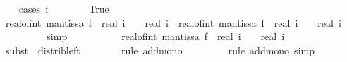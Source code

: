 \begin{isabellebody}
\ \ \isamarkupfalse%
\ {\isacharparenleft}{\kern0pt}cases\ {\isachardoublequoteopen}i\ {\isasymge}\ {}{\isachardoublequoteclose}{\isacharparenright}{\kern0pt}\isanewline
\ \ \ \ \isamarkupfalse%
\ True\isanewline
\ \ \ \ \isamarkupfalse%
\ {\isachardoublequoteopen}{\isasymbar}real{\isacharunderscore}{\kern0pt}of{\isacharunderscore}{\kern0pt}int\ {\isacharparenleft}{\kern0pt}mantissa\ f{\isacharparenright}{\kern0pt}{\isasymbar}\ {\isacharasterisk}{\kern0pt}\ {\isacharparenleft}{\kern0pt}real\ i\ {\isacharplus}{\kern0pt}\ {}{\isacharparenright}{\kern0pt}\ {\isacharplus}{\kern0pt}\ real\ i\ {\isacharequal}{\kern0pt}\ {\isasymbar}real{\isacharunderscore}{\kern0pt}of{\isacharunderscore}{\kern0pt}int\ {\isacharparenleft}{\kern0pt}mantissa\ f{\isacharparenright}{\kern0pt}{\isasymbar}\ {\isacharasterisk}{\kern0pt}\ {\isacharparenleft}{\kern0pt}real\ i\ {\isacharplus}{\kern0pt}\ {}{\isacharparenright}{\kern0pt}\ {\isacharplus}{\kern0pt}\ {\isacharparenleft}{\kern0pt}real\ i\ {\isacharminus}{\kern0pt}\ {}{\isacharparenright}{\kern0pt}\ {\isacharplus}{\kern0pt}\ {}{\isachardoublequoteclose}\isanewline
\ \ \ \ \ \ \isamarkupfalse%
\ simp\isanewline
\ \ \ \ \isamarkupfalse%
\ \isamarkupfalse%
\ {\isachardoublequoteopen}{\isachardot}{\kern0pt}{\isachardot}{\kern0pt}{\isachardot}{\kern0pt}\ \ {\isasymle}\ {\isasymbar}real{\isacharunderscore}{\kern0pt}of{\isacharunderscore}{\kern0pt}int\ {\isacharparenleft}{\kern0pt}mantissa\ f{\isacharparenright}{\kern0pt}{\isasymbar}\ {\isacharasterisk}{\kern0pt}\ {\isacharparenleft}{\kern0pt}{\isacharparenleft}{\kern0pt}real\ i\ {\isacharplus}{\kern0pt}\ {}{\isacharparenright}{\kern0pt}\ {\isacharplus}{\kern0pt}\ {\isacharparenleft}{\kern0pt}real\ i\ {\isacharminus}{\kern0pt}\ {}{\isacharparenright}{\kern0pt}{\isacharparenright}{\kern0pt}\ {\isacharplus}{\kern0pt}\ {}{\isachardoublequoteclose}\isanewline
\ \ \ \ \ \ \isamarkupfalse%
\ {\isacharparenleft}{\kern0pt}subst\ {\isacharparenleft}{\kern0pt}{}{\isacharparenright}{\kern0pt}\ distrib{\isacharunderscore}{\kern0pt}left{\isacharparenright}{\kern0pt}\isanewline
\ \ \ \ \ \ \isamarkupfalse%
\ {\isacharparenleft}{\kern0pt}rule\ add{\isacharunderscore}{\kern0pt}mono{\isacharparenright}{\kern0pt}\isanewline
\ \ \ \ \ \ \ \isamarkupfalse%
\ {\isacharparenleft}{\kern0pt}rule\ add{\isacharunderscore}{\kern0pt}mono{\isacharcomma}{\kern0pt}\ simp{\isacharparenright}{\kern0pt}\isanewline

\end{isabellebody}
